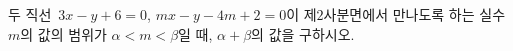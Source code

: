 두 직선~$3x-y+6=0$, $mx-y-4m+2=0$이 제$2$사분면에서 만나도록 하는 실수 $m$의 값의 범위가 $\alpha<m<\beta$일 때, $\alpha+\beta$의 값을 구하시오.
